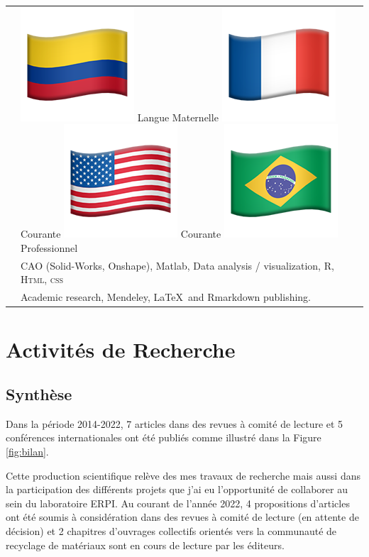 \documentclass[
  12pt,
  oneside]{book}
\begin{document}
\extrarowsep=3pt
\begin{tabu} to \linewidth {X[0.1,l] X[2,l]}

  & 
\includegraphics[width=2ex]{Figures/icons/flag-colombia.png} Langue Maternelle\quad 
\includegraphics[width=2ex]{Figures/icons/flag-france.png} Courante  \quad\includegraphics[width=2ex]{Figures/icons/flag-usa.png} Courante  \quad
\includegraphics[width=2ex]{Figures/icons/flag-brazil.png} Professionnel \\[5pt] 


  & CAO (Solid-Works, Onshape), Matlab,  Data analysis / visualization, R, \textsc{Html, css} \\[5pt]
    

  & Academic research,  Mendeley, \LaTeX ~and Rmarkdown publishing.

\end{tabu}

\hypertarget{activituxe9s-de-recherche}{%
\chapter{Activités de Recherche}\label{activituxe9s-de-recherche}}

\hypertarget{synthuxe8se}{%
\section{Synthèse}\label{synthuxe8se}}

Dans la période 2014-2022, 7 articles dans des revues à comité de lecture et 5 conférences internationales ont été publiés comme illustré dans la Figure \ref{fig:bilan}.

Cette production scientifique relève des mes travaux de recherche mais aussi dans la participation des différents projets que j'ai eu l'opportunité de collaborer au sein du laboratoire ERPI.
Au courant de l'année 2022, 4 propositions d'articles ont été soumis à considération dans des revues à comité de lecture (en attente de décision) et 2 chapitres d'ouvrages collectifs orientés vers la communauté de recyclage de matériaux sont en cours de lecture par les éditeurs.
\end{document}
